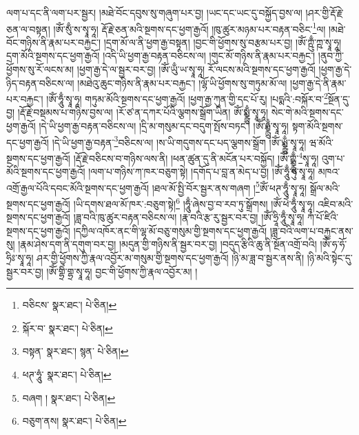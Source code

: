 ལག་པ་དང་ནི་ལག་པར་སྦྱར། །མཐེ་བོང་དབུས་སུ་གཞུག་པར་བྱ། །ཡང་དང་ཡང་དུ་བསྐྱོད་བྱས་ལ། །ཤར་གྱི་རྡོ་རྗེ་ཅན་ལ་བསྟན། །ཨོཾ་སུྃ་ས་སྭཱ་ཧཱ། རྡོ་རྗེ་ཅན་མའི་སྔགས་དང་ཕྱག་རྒྱའོ། །ཁུ་ཚུར་མཉམ་པར་བརྟན་བཅིང་\footnote{བཅིངས་  སྣར་ཐང་།  པེ་ཅིན། }ལ། །མཐེ་བོང་གཉིས་ནི་རྣམ་པར་བརྐྱང་། །དྲག་མོ་ལ་ནི་ཕྱག་རྒྱ་བསྟན། །བྱང་གི་ཕྱོགས་སུ་བརྩམ་པར་བྱ། །ཨོཾ་ཀྵུྃ་ཀྵ་སྭཱ་ཧཱ། དྲག་མོའི་སྔགས་དང་ཕྱག་རྒྱའོ། །འདི་ཡི་ཕྱག་རྒྱ་བརྟན་བཅིངས་ལ། །གུང་མོ་གཉིས་ནི་རྣམ་པར་བརྐྱང་། །ནུབ་ཀྱི་ཕྱོགས་སུ་རོ་ལངས་མ། །ཕྱག་རྒྱ་དེ་ལ་སྦྱར་བར་བྱ། །ཨོཾ་ཡུྃ་ཡ་སྭཱ་ཧཱ། རོ་ལངས་མའི་སྔགས་དང་ཕྱག་རྒྱའོ། །ཕྱག་རྒྱ་དེ་ཉིད་བརྟན་བཅིངས་ལ། །མཐེའུ་ཆུང་གཉིས་ནི་རྣམ་པར་བརྐྱང་། །ལྷོ་ཡི་ཕྱོགས་སུ་གཏུམ་མོ་ལ། །ཕྱག་རྒྱ་དེ་ནི་རྣམ་པར་བརྐྱང་། །ཨོཾ་ཧཱུྃ་སྭཱ་ཧཱ། གཏུམ་མོའི་སྔགས་དང་ཕྱག་རྒྱའོ། །ཕྱག་རྒྱ་ཀུན་གྱི་དང་པོ་རུ། །པདྨའི་:བསྐོར་བ་\footnote{སྐོར་བ་  སྣར་ཐང་།  པེ་ཅིན། }སྔོན་དུ་བྱ། །རྡོ་རྗེ་བསྡམས་པ་གཉིས་བྱས་ལ། །རོ་ཙ་ན་དཀར་པོའི་ལྕགས་སྒྲོག་ཡིན། ཨོཾ་སྨྼྻུྃ་སྭཱ་ཧཱ། སེང་གེ་མའི་སྔགས་དང་ཕྱག་རྒྱའོ། །དེ་ཡི་ཕྱག་རྒྱ་བརྟན་བཅིངས་ལ། །དྲི་མ་གསུམ་དང་བདུག་སྤོས་བཏང་། །ཨོཾ་ཧྨྼྻུྃ་སྭཱ་ཧཱ། སྟག་མོའི་སྔགས་དང་ཕྱག་རྒྱའོ། །དེ་ཡི་ཕྱག་རྒྱ་བརྟན་\footnote{བསྟན་  སྣར་ཐང་། སྙན་  པེ་ཅིན། }བཅིངས་ལ། །ས་ཡི་གདུགས་དང་པད་ལྕགས་སྒྲོག །ཨོཾ་ཡྨྼྻུྃ་སྭཱ་ཧཱ། ཝ་མོའི་སྔགས་དང་ཕྱག་རྒྱའོ། །རྡོ་རྗེ་བཅིངས་བ་གཉིས་ལས་ནི། །ཕན་ཚུན་དུ་ནི་མངོན་པར་བསྐྱོད། །ཨོཾ་ཀྵྨྼྻུྃ་\footnote{ཕཊ་ཧཱུཾ་  སྣར་ཐང་།  པེ་ཅིན། }སྭཱ་ཧཱ། འུག་པ་མོའི་སྔགས་དང་ཕྱག་རྒྱའོ། །ལག་པ་གཉིས་ཀ་ཁར་བཅུག་སྟེ། །དགོད་པ་བླ་ན་མེད་པ་བྱ། །ཨོཾ་ཧཱུྃ་ཧུ་སྭཱ་ཧཱ། མཁའ་འགྲོ་རྒྱལ་པོའི་དབང་མོའི་སྔགས་དང་ཕྱག་རྒྱའོ། །ཐལ་མོ་སྤྱི་བོར་སྦྱར་ནས་གཞག །\footnote{བཞག །  སྣར་ཐང་།  པེ་ཅིན། }ཨོཾ་ཕཊ་ཧཱུྃ་སྭཱ་ཧཱ། སྒྲོལ་མའི་སྔགས་དང་ཕྱག་རྒྱའོ། །ཡི་དགས་ཐལ་མོ་ཁར་:བཅུག་སྟེ།\footnote{བཅུག་ནས།  སྣར་ཐང་།  པེ་ཅིན། } །ཧཱུྃ་ཞེས་བྱ་བ་རབ་ཏུ་སྒྲོགས། །ཨོཾ་ཕེཾ་ཧཱུྃ་སྭཱ་ཧཱ། འཇིབ་མའི་སྔགས་དང་ཕྱག་རྒྱའོ། །ཟླ་བའི་ཁུ་ཚུར་བརྟན་བཅིངས་ལ། །རྣ་བའི་རྩ་རུ་སྦྱར་བར་བྱ། །ཨོཾ་ཧྲཱི་ཧཱུྃ་སྭཱ་ཧཱ། ཀཾ་པོ་ཛིའི་སྔགས་དང་ཕྱག་རྒྱའོ། །དཀྱིལ་འཁོར་ནང་གི་ལྷ་མོ་བཅུ་གསུམ་གྱི་སྔགས་དང་ཕྱག་རྒྱའོ། །ཟླ་བའི་ལག་པ་བརྐྱང་ནས་སུ། །རྣམ་ཤེས་དག་ནི་དགུག་བར་བྱ། །མདུན་གྱི་གཉིས་ནི་སྦྱར་བར་བྱ། །བདུད་རྩིའི་ཆུ་ནི་སྔོན་འགྲོ་བའི། །ཨོཾ་ཧ་ཧོ་ཧྲིཿ་སྭཱ་ཧཱ། ཤར་གྱི་ཕྱོགས་ཀྱི་རྣལ་འབྱོར་མ་གསུམ་གྱི་སྔགས་དང་ཕྱག་རྒྱའོ། །ཉི་མ་ཟླ་བ་སྦྱར་ནས་ནི། །ཉི་མའི་སྟེང་དུ་སྦྱར་བར་བྱ། །ཨོཾ་གྷྲིཾ་གྷྲ་སྭཱ་ཧཱ། བྱང་གི་ཕྱོགས་ཀྱི་རྣལ་འབྱོར་མ། །
